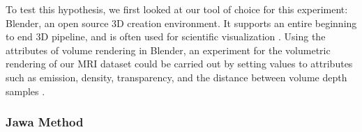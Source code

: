 To test this hypothesis, we first looked at our tool of choice for this experiment: Blender, an open source 3D creation environment.  It supports an entire beginning to end 3D pipeline, and is often used for scientific visualization \cite{garate2017voxel} \cite{kent20143d}. Using the attributes of volume rendering in Blender, an experiment for the volumetric rendering of our MRI dataset could be carried out by setting values to attributes such as emission, density, transparency, and the distance between volume depth samples \cite{volumerender2019}.
\\


\subsubsection{Jawa Method}